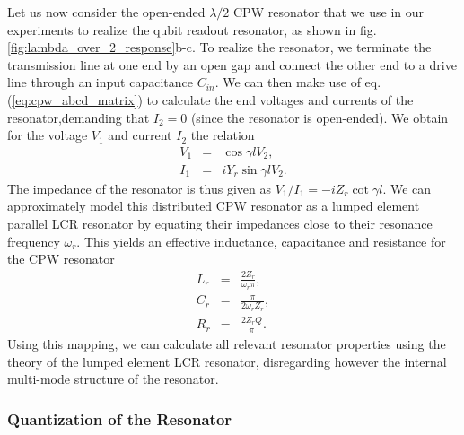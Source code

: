 Let us now consider the open-ended $\lambda / 2$ CPW resonator that we use in our experiments to realize the qubit readout resonator, as shown in fig. \ref{fig:lambda_over_2_response}b-c. To realize the resonator, we terminate the transmission line at one end by an open gap and connect the other end to a drive line through an input capacitance $C_{in}$. We can then make use of eq. (\ref{eq:cpw_abcd_matrix}) to calculate the end voltages and currents of the resonator,demanding that $I_2=0$ (since the resonator is open-ended). We obtain for the voltage $V_1$ and current $I_2$ the relation
%
\begin{eqnarray}
V_1 & = & \cos{\gamma l} V_2, \\
I_1 & = & i Y_r \sin{\gamma l} V_2.
\end{eqnarray}
%
The impedance of the resonator is thus given as $V_1/I_1 = -i Z_r \cot{\gamma l}$. We can approximately model this distributed CPW resonator as a lumped element parallel LCR resonator by equating their impedances close to their resonance frequency $\omega_r$. This yields an effective inductance, capacitance and resistance for the CPW resonator
%
\begin{eqnarray}
L_{r} & = & \frac{2 Z_r}{\omega_r \pi}, \\
C_{r} & = & \frac{\pi}{2\omega_r Z_r}, \\
R_{r} & = & \frac{2 Z_r Q}{\pi}. \label{eq:lcr_cpw_values}
\end{eqnarray}
%
Using this mapping, we can calculate all relevant resonator properties using the theory of the lumped element LCR resonator, disregarding however the internal multi-mode structure of the resonator.

\subsubsection{Quantization of the Resonator}

